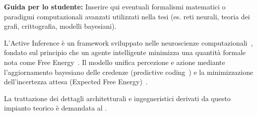\textbf{Guida per lo studente:} Inserire qui eventuali formalismi matematici o paradigmi computazionali avanzati utilizzati nella tesi (es. reti neurali, teoria dei grafi, crittografia, modelli bayesiani).

L'Active Inference è un framework sviluppato nelle neuroscienze computazionali~\cite{friston2010free, parr2022active}, fondato sul principio che un agente intelligente minimizza una quantità formale nota come Free Energy~\cite{friston2017active}. Il modello unifica percezione e azione mediante l'aggiornamento bayesiano delle credenze (predictive coding~\cite{rao1999predictive, feldman2010attention}) e la minimizzazione dell'incertezza attesa (Expected Free Energy)~\cite{friston2015epistemic, da2020active, parr2019generalised, schwartenbeck2019computational, mirza2019introducing}.

La trattazione dei dettagli architetturali e ingegneristici derivati da questo impianto teorico è demandata al .